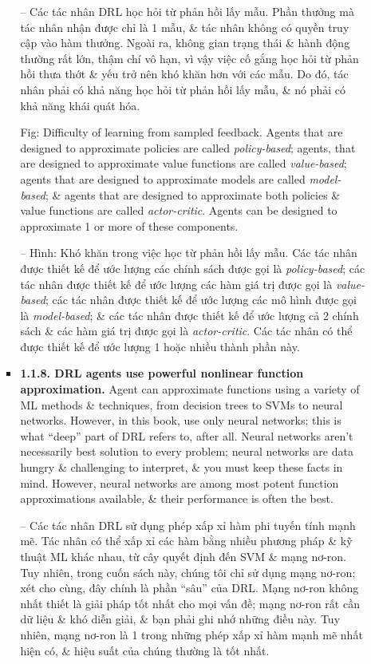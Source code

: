 \documentclass{article}
\begin{document}
\begin{itemize}
\begin{itemize}
\begin{itemize}
            -- {\sf Các tác nhân DRL học hỏi từ phản hồi lấy mẫu.} Phần thưởng mà tác nhân nhận được chỉ là 1 mẫu, \& tác nhân không có quyền truy cập vào hàm thưởng. Ngoài ra, không gian trạng thái \& hành động thường rất lớn, thậm chí vô hạn, vì vậy việc cố gắng học hỏi từ phản hồi thưa thớt \& yếu trở nên khó khăn hơn với các mẫu. Do đó, tác nhân phải có khả năng học hỏi từ phản hồi lấy mẫu, \& nó phải có khả năng khái quát hóa.

            {\sf Fig: Difficulty of learning from sampled feedback.} Agents that are designed to approximate policies are called {\it policy-based}; agents, that are designed to approximate value functions are called {\it value-based}; agents that are designed to approximate models are called {\it model-based}; \& agents that are designed to approximate both policies \& value functions are called {\it actor-critic}. Agents can be designed to approximate 1 or more of these components.

            -- {\sf Hình: Khó khăn trong việc học từ phản hồi lấy mẫu.} Các tác nhân được thiết kế để ước lượng các chính sách được gọi là {\it policy-based}; các tác nhân được thiết kế để ước lượng các hàm giá trị được gọi là {\it value-based}; các tác nhân được thiết kế để ước lượng các mô hình được gọi là {\it model-based}; \& các tác nhân được thiết kế để ước lượng cả 2 chính sách \& các hàm giá trị được gọi là {\it actor-critic}. Các tác nhân có thể được thiết kế để ước lượng 1 hoặc nhiều thành phần này.
            \item {\bf1.1.8. DRL agents use powerful nonlinear function approximation.} Agent can approximate functions using a variety of ML methods \& techniques, from decision trees to SVMs to neural networks. However, in this book, use only neural networks; this is what ``deep'' part of DRL refers to, after all. Neural networks aren't necessarily best solution to every problem; neural networks are data hungry \& challenging to interpret, \& you must keep these facts in mind. However, neural networks are among most potent function approximations available, \& their performance is often the best.

            -- {\sf Các tác nhân DRL sử dụng phép xấp xỉ hàm phi tuyến tính mạnh mẽ.} Tác nhân có thể xấp xỉ các hàm bằng nhiều phương pháp \& kỹ thuật ML khác nhau, từ cây quyết định đến SVM \& mạng nơ-ron. Tuy nhiên, trong cuốn sách này, chúng tôi chỉ sử dụng mạng nơ-ron; xét cho cùng, đây chính là phần ``sâu'' của DRL. Mạng nơ-ron không nhất thiết là giải pháp tốt nhất cho mọi vấn đề; mạng nơ-ron rất cần dữ liệu \& khó diễn giải, \& bạn phải ghi nhớ những điều này. Tuy nhiên, mạng nơ-ron là 1 trong những phép xấp xỉ hàm mạnh mẽ nhất hiện có, \& hiệu suất của chúng thường là tốt nhất.


\end{itemize}
\end{itemize}
\end{itemize}
\end{document}

